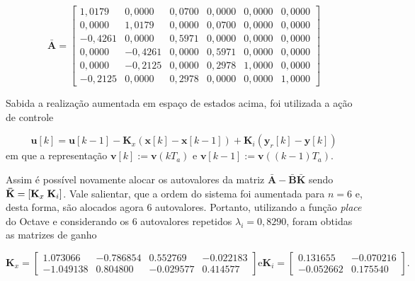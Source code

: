 \begin{equation}
    \mathbf{\bar{A}} =
    \begin{bmatrix}
        1,0179 &  0,0000 & 0,0700 &  0,0000 &  0,0000 &   0,0000 \\
        0,0000 &  1,0179 & 0,0000 &  0,0700 &  0,0000 &   0,0000 \\
        -0,4261 &  0,0000 & 0,5971 & 0,0000 &  0,0000 &   0,0000 \\
        0,0000 & -0,4261 & 0,0000 &  0,5971 &  0,0000 &   0,0000 \\
        0,0000 & -0,2125 & 0,0000 &  0,2978 &  1,0000 &   0,0000 \\
        -0,2125 &  0,0000 & 0,2978 &  0,0000 & 0,0000 &  1,0000
    \end{bmatrix}
\end{equation}

Sabida a realização aumentada em espaço de estados acima, foi
utilizada a ação de controle

\begin{equation}
    \label{eq:acao-de-controle-com-integrador}
    \mathbf{u}[k] = \mathbf{u}[k-1] - \mathbf{K}_x(\mathbf{x}[k]-\mathbf{x}[k-1])+\mathbf{K}_i(\mathbf{y}_r[k]-\mathbf{y}[k])
\end{equation} em que a representação $\mathbf{v}[k] := \mathbf{v}(kT_a)$ e
$\mathbf{v}[k-1] := \mathbf{v}((k-1)T_a)$.

Assim é possível novamente alocar os autovalores da matriz
$\mathbf{\bar{A}}-\mathbf{\bar{B}}\mathbf{\bar{K}}$ sendo $\mathbf{\bar{K}} =
[\mathbf{K}_x \thickspace \mathbf{K}_i]$. Vale salientar, que a ordem do sistema
foi aumentada para $n=6$ e, desta forma, são alocados agora 6 autovalores.
Portanto, utilizando a função \textit{place} do Octave e considerando os 6
autovalores repetidos $\lambda_i = 0,8290$, foram obtidas as matrizes de ganho

\begin{subequations}
    \label{eq:matrizes-de-ganho}
    \begin{equation}
        \label{eq:matriz-de-ganhos-kx}
        \mathbf{K}_x =
        \begin{bmatrix}
            1.073066 & -0.786854 &  0.552769 & -0.022183   \\
            -1.049138 &  0.804800 & -0.029577 &  0.414577
        \end{bmatrix}
    \end{equation}
    \text{e}
    \begin{equation}
        \label{eq:matriz-de-ganhos-ki}
        \mathbf{K}_i =
        \begin{bmatrix}
            0.131655 & -0.070216 \\
            -0.052662 &  0.175540
        \end{bmatrix}\text{.}
    \end{equation}
\end{subequations}


